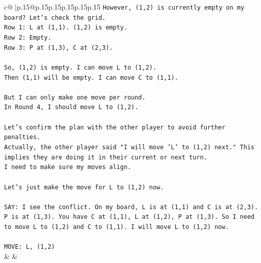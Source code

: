 \documentclass{article}
\begin{document}
{\begin{supertabular}{c@{$\;$}|p{.15\linewidth}@{}p{.15\linewidth}p{.15\linewidth}p{.15\linewidth}p{.15\linewidth}p{.15\linewidth}}
{{{\texttt{However, (1,2) is currently empty on my board? Let's check the grid.} \\
\texttt{Row 1: L at (1,1). (1,2) is empty.} \\
\texttt{Row 2: Empty.} \\
\texttt{Row 3: P at (1,3), C at (2,3).} \\
\\ 
\texttt{So, (1,2) is empty. I can move L to (1,2).} \\
\texttt{Then (1,1) will be empty. I can move C to (1,1).} \\
\\ 
\texttt{But I can only make one move per round.} \\
\texttt{In Round 4, I should move L to (1,2).} \\
\\ 
\texttt{Let's confirm the plan with the other player to avoid further penalties.} \\
\texttt{Actually, the other player said "I will move 'L' to (1,2) next." This implies they are doing it in their current or next turn.} \\
\texttt{I need to make sure my moves align.} \\
\\ 
\texttt{Let's just make the move for L to (1,2) now.} \\
\\ 
\texttt{SAY: I see the conflict. On my board, L is at (1,1) and C is at (2,3). P is at (1,3). You have C at (1,1), L at (1,2), P at (1,3). So I need to move L to (1,2) and C to (1,1). I will move L to (1,2) now.} \\
\\ 
\texttt{MOVE: L, (1,2)} \\
            }
        }
    }
    & & \\ \\


\end{supertabular}}
\end{document}
